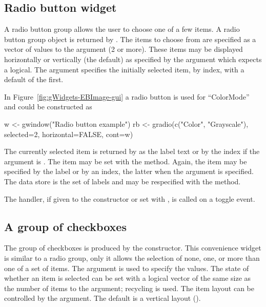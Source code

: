 \subsection{Radio button widget}
\label{sec:gWidgets-radio-button-widget}

A radio button group allows the user to choose one of a few
items. A radio button group object is returned by
. The items to choose from are specified as a
vector of values to the  argument (2 or more). These items
may be displayed horizontally or vertically (the default) as specified by the
 argument which expects a logical. The
 argument specifies the initially selected
item, by index,
with a default of the first.


In Figure~\ref{fig:gWidgets-EBImage-gui} a radio button is used for
``ColorMode''  and could be constructed as

\begin{Schunk}
\begin{Sinput}
 w <- gwindow("Radio button example")
 rb <- gradio(c("Color", "Grayscale"), selected=2, 
              horizontal=FALSE, cont=w)
\end{Sinput}
\end{Schunk}


The currently selected item is returned by  as
the label text or by the index if the argument  is
. The item may be set with the
 method. Again, the item may be
specified by the label or by an index, the latter when the argument
 is specified. The data store is the set of labels
and may be respecified with the \method{[\ASSIGN}{gradio} method.

The handler, if given to the constructor or set with
, is called on a toggle event.

\subsection{A group of checkboxes}
\label{sec:gWidgets-group-checkboxes}


The group of checkboxes is produced by the
 constructor. This convenience widget is
similar to a radio group, only it allows the selection of none, one,
or more than one of a set of items.  The
 argument is used to specify the
values. The state of whether an item is selected can be set with a
logical vector of the same size as the number of items to the
 argument; recycling is used. The
item layout can be controlled by the
 argument. The default is a
vertical layout ().


